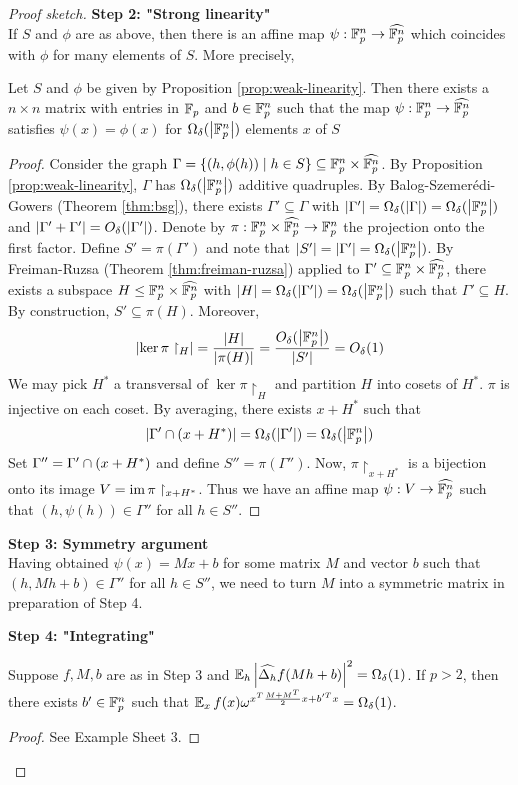 \documentclass{article}
\begin{document}
\begin{proof}[Proof sketch]
  {\bf Step 2: "Strong linearity"} \\
  If $S$ and $\phi$ are as above, then there is an affine map $\psi : \mathbb F_p^n \to \widehat{\mathbb F_p^n}$ which coincides with $\phi$ for many elements of $S$. More precisely,
  \begin{nprop}
    Let $S$ and $\phi$ be given by Proposition \ref{prop:weak-linearity}. Then there exists a $n \times n$ matrix with entries in $\mathbb F_p$ and $b \in \mathbb F_p^n$ such that the map $\psi : \mathbb F_p^n \to \widehat{\mathbb F_p^n}$ satisfies $\psi(x) = \phi(x)$ for $\Omega_\delta(\left\lvert \mathbb F_p^n\right\rvert)$ elements $x$ of $S$
  \end{nprop}
  \begin{proof}
    Consider the graph $\Gamma = \{(h, \phi(h)) \mid h \in S\} \subseteq \mathbb F_p^n \times \widehat{\mathbb F_p^n}$. By Proposition \ref{prop:weak-linearity}, $\Gamma$ has $\Omega_\delta(\left\lvert \mathbb F_p^n\right\rvert)$ additive quadruples. By Balog-Szemerédi-Gowers (Theorem \ref{thm:bsg}), there exists $\Gamma' \subseteq \Gamma$ with $\left\lvert \Gamma'\right\rvert = \Omega_\delta(\left\lvert \Gamma\right\rvert) = \Omega_\delta(\left\lvert \mathbb F_p^n\right\rvert)$ and $\left\lvert \Gamma' + \Gamma'\right\rvert = O_\delta(\left\lvert \Gamma'\right\rvert)$. Denote by $\pi : \mathbb F_p^n \times \widehat{\mathbb F_p^n} \to \mathbb F_p^n$ the projection onto the first factor. Define $S' = \pi(\Gamma')$ and note that $\left\lvert S'\right\rvert = \left\lvert \Gamma'\right\rvert = \Omega_\delta(\left\lvert \mathbb F_p^n\right\rvert)$. By Freiman-Ruzsa (Theorem \ref{thm:freiman-ruzsa}) applied to $\Gamma' \subseteq \mathbb F_p^n \times \widehat{\mathbb F_p^n}$, there exists a subspace $H \le \mathbb F_p^n \times \widehat{\mathbb F_p^n}$ with $\left\lvert H\right\rvert = \Omega_\delta(\left\lvert \Gamma'\right\rvert) = \Omega_\delta(\left\lvert \mathbb F_p^n\right\rvert)$ such that $\Gamma' \subseteq H$. By construction, $S' \subseteq \pi(H)$. Moreover,
    $$\left\lvert \ker \pi\restriction_H\right\rvert = \frac{\left\lvert H\right\rvert}{\left\lvert \pi(H)\right\rvert} = \frac{O_\delta(\left\lvert \mathbb F_p^n\right\rvert)}{\left\lvert S'\right\rvert} = O_\delta(1)$$
    We may pick $H^*$ a transversal of $\ker \pi\restriction_H$ and partition $H$ into cosets of $H^*$. $\pi$ is injective on each coset. By averaging, there exists $x + H^*$ such that
    $$\left\lvert \Gamma' \cap (x + H^*)\right\rvert = \Omega_\delta(\left\lvert \Gamma'\right\rvert) = \Omega_\delta(\left\lvert \mathbb F_p^n\right\rvert)$$
    Set $\Gamma'' = \Gamma' \cap (x + H^*)$ and define $S'' = \pi(\Gamma'')$. Now, $\pi\restriction_{x + H^*}$ is a bijection onto its image $V = \operatorname{im} \pi\restriction_{x + H^*}$. Thus we have an affine map $\psi : V \to \widehat{\mathbb F_p^n}$ such that $(h, \psi(h)) \in \Gamma''$ for all $h \in S''$.
  \end{proof}
  
  {\bf Step 3: Symmetry argument} \\
  Having obtained $\psi(x) = Mx + b$ for some matrix $M$ and vector $b$ such that $(h, Mh + b) \in \Gamma''$ for all $h \in S''$, we need to turn $M$ into a symmetric matrix in preparation of Step 4.

  {\bf Step 4: "Integrating"}
  \begin{nprop}
    Suppose $f, M, b$ are as in Step 3 and $\E_h \abs{\widehat{\Delta_h}f(Mh + b)}^2 = \Omega_\delta(1)$. If $p > 2$, then there exists $b' \in \mathbb F_p^n$ such that $\E_x f(x) \omega^{x^T\frac{M + M^T}2 x + b'^T x} = \Omega_\delta(1)$.
  \end{nprop}
  \begin{proof}
    See Example Sheet 3.
  \end{proof}
\end{proof}
\end{document}
